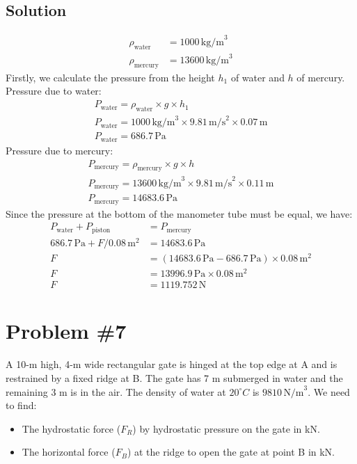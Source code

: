\documentclass[12pt]{article}
\begin{document}
\subsection*{Solution}
\begin{align*}
\rho_{\text{water}} &= 1000 \, \text{kg/m}^3 \\
\rho_{\text{mercury}} &= 13600 \, \text{kg/m}^3
\end{align*}
Firstly, we calculate the pressure from the height \( h_1 \) of water and \( h \) of mercury.
\newline
Pressure due to water:
\begin{align*}
P_{\text{water}} = \rho_{\text{water}} \times g \times h_1 \\
P_{\text{water}} = 1000 \, \text{kg/m}^3 \times 9.81 \, \text{m/s}^2 \times 0.07 \, \text{m} \\
P_{\text{water}} = 686.7 \, \text{Pa}
\end{align*}
Pressure due to mercury:
\begin{align*}
P_{\text{mercury}} = \rho_{\text{mercury}} \times g \times h \\
P_{\text{mercury}} = 13600 \, \text{kg/m}^3 \times 9.81 \, \text{m/s}^2 \times 0.11 \, \text{m} \\
P_{\text{mercury}} = 14683.6 \, \text{Pa}
\end{align*}
Since the pressure at the bottom of the manometer tube must be equal, we have:
\begin{align*}
P_{\text{water}} + P_{\text{piston}} &= P_{\text{mercury}} \\
686.7 \, \text{Pa} + F / 0.08 \, \text{m}^2 &= 14683.6 \, \text{Pa} \\
F &= (14683.6 \, \text{Pa} - 686.7 \, \text{Pa}) \times 0.08 \, \text{m}^2 \\
F &= 13996.9 \, \text{Pa} \times 0.08 \, \text{m}^2 \\
F &= 1119.752 \, \text{N}
\end{align*}

\newpage
\section*{Problem \#7}
A 10-m high, 4-m wide rectangular gate is hinged at the top edge at A and is restrained by a fixed ridge at B. The gate has 7 m submerged in water and the remaining 3 m is in the air. The density of water at \(20^\circ C\) is \(9810 \, \text{N/m}^3\). We need to find:

\begin{itemize}
\item[a.] The hydrostatic force (\(F_R\)) by hydrostatic pressure on the gate in kN.
\item[b.] The horizontal force (\(F_B\)) at the ridge to open the gate at point B in kN.
\end{itemize}
\end{document}
